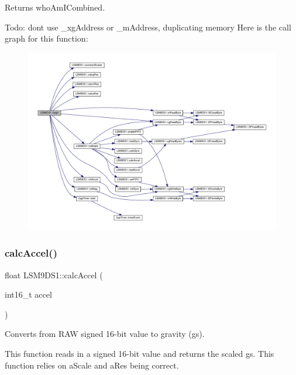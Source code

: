 \begin{DoxyReturn}{Returns}
who\+Am\+I\+Combined. 
\end{DoxyReturn}
Todo\+: don\textquotesingle{}t use \+\_\+xg\+Address or \+\_\+m\+Address, duplicating memory Here is the call graph for this function\+:\nopagebreak
\begin{figure}[H]
\begin{center}
\leavevmode
\includegraphics[width=350pt]{classLSM9DS1_a8728e560c76bd120b3711af15a6ecbd6_cgraph}
\end{center}
\end{figure}
\mbox{\label{classLSM9DS1_a54e2a7888b67b47cf0dd986c5b91a3c5}} 
\subsubsection{\texorpdfstring{calc\+Accel()}{calcAccel()}}
{\footnotesize\ttfamily float L\+S\+M9\+D\+S1\+::calc\+Accel (\begin{DoxyParamCaption}\item[{int16\+\_\+t}]{accel }\end{DoxyParamCaption})}



Converts from R\+AW signed 16-\/bit value to gravity (g\textquotesingle{}s). 

This function reads in a signed 16-\/bit value and returns the scaled g\textquotesingle{}s. This function relies on a\+Scale and a\+Res being correct.


